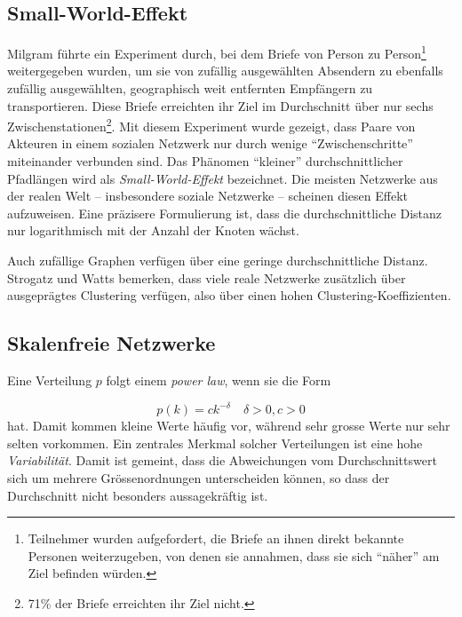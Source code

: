 \subsection{Small-World-Effekt}
\label{sec:small-world-effekt}

Milgram führte ein Experiment durch, bei dem Briefe von Person zu
Person\footnote{Teilnehmer wurden aufgefordert, die Briefe an ihnen
  direkt bekannte Personen weiterzugeben, von denen sie annahmen, dass
  sie sich ``näher'' am Ziel befinden würden.} weitergegeben
wurden, um sie von zufällig ausgewählten Absendern zu ebenfalls
zufällig ausgewählten, geographisch weit entfernten Empfängern
zu transportieren\cite{Travers1969}. Diese Briefe erreichten ihr Ziel
im Durchschnitt über nur sechs Zwischenstationen\footnote{71\% der
  Briefe erreichten ihr Ziel nicht.}. Mit diesem Experiment wurde
gezeigt, dass Paare von Akteuren in einem sozialen Netzwerk nur durch
wenige ``Zwischenschritte'' miteinander verbunden sind. Das Phänomen
``kleiner'' durchschnittlicher Pfadlängen wird als
\emph{Small-World-Effekt} bezeichnet. Die meisten Netzwerke aus der
realen Welt -- insbesondere soziale Netzwerke -- scheinen diesen
Effekt aufzuweisen\cite{newman:167}. Eine präzisere Formulierung
ist, dass die durchschnittliche Distanz nur logarithmisch mit der
Anzahl der Knoten wächst.

Auch zufällige Graphen verfügen über eine geringe
durchschnittliche Distanz. Strogatz und Watts bemerken, dass viele
reale Netzwerke zusätzlich über ausgeprägtes Clustering
verfügen, also über einen hohen
Clustering-Koeffizienten\cite{Watts1998}.

\subsection{Skalenfreie Netzwerke}
\label{sec:skal-netzw}

Eine Verteilung $p$ folgt einem \emph{power law}, wenn sie die Form

\begin{equation}
  \label{eq:8}
  p(k) = ck^{-\delta} \quad \delta > 0, c > 0
\end{equation}
hat\cite{Baumann2004}. Damit kommen kleine Werte h\"aufig vor,
w\"ahrend sehr grosse Werte nur sehr selten vorkommen.  Ein zentrales
Merkmal solcher Verteilungen ist eine hohe
\emph{Variabilit\"at}. Damit ist gemeint, dass die Abweichungen vom
Durchschnittswert sich um mehrere Gr\"ossenordnungen unterscheiden
k\"onnen, so dass der Durchschnitt nicht besonders aussagekr\"aftig
ist.

